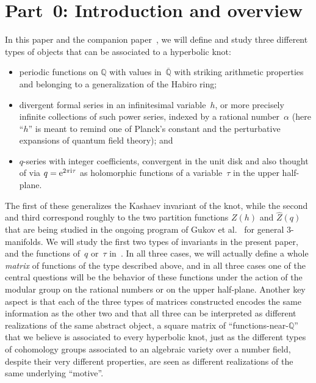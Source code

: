 \documentclass[pdftex]{sigma}
\numberwithin{equation}{section}
\def\a{\alpha}
\def\Q{\mathbb Q}
\def\a{\alpha}
\def\Qbar{\overline{\Q}}
\begin{document}


\part*{Part~0: Introduction and overview}%

In this paper and the companion paper~\cite{GZ:qseries}, we will define and study
three different types of objects that can be associated to a hyperbolic knot:
\begin{itemize}\itemsep=0pt
\item periodic functions on $\Q$ with values in~$\Qbar$ with striking
arithmetic properties and belonging to a generalization of the Habiro ring;

\item divergent formal series in an infinitesimal variable~$h$, or more
precisely infinite collections of such power series, indexed by a rational number~$\a$
(here ``$h$'' is meant to remind one of Planck's constant and the perturbative expansions
of quantum field theory); and

\item $q$-series with integer coefficients, convergent in the unit disk
and also thought of via ${q={\rm e}^{2\pi{\rm i}\tau}}$ as holomorphic functions of a variable~$\tau$
in the upper half-plane.
\end{itemize}

The first of these generalizes the Kashaev invariant of the knot, while the
second and third correspond roughly to the two partition functions $Z(h)$ and
$\widehat{Z}(q)$ that are being studied in the ongoing program of Gukov et
al.\ \cite{Gukov:largeN, Gukov:BPS} for general 3-manifolds. We will study the first two
types of invariants in the present paper, and the functions of~$q$ or~$\tau$
in~\cite{GZ:qseries}. In all three cases, we will actually define a whole \emph{matrix}
of functions of the type described above, and in all three cases one of the central
questions will be the behavior of these functions under the action of the modular group
on the rational numbers or on the upper half-plane. Another key aspect is that each of
the three types of matrices constructed encodes the same information as the other two
and that all three can be interpreted as different realizations of the same abstract
object, a square matrix of ``functions-near-$\Q$'' that we believe is associated to
every hyperbolic knot, just as the different types of cohomology groups associated to
an algebraic variety over a number field, despite their very different properties,
are seen as different realizations of the same underlying ``motive''.
\end{document}
